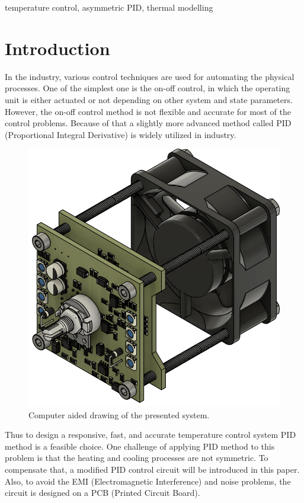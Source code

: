 \documentclass[conference]{IEEEtran}
\begin{document}
\begin{IEEEkeywords}
temperature control, asymmetric PID, thermal modelling
\end{IEEEkeywords}

\section{Introduction}
In the industry, various control techniques are used for automating the physical processes. One of the simplest one is the on-off control, in which the operating unit is either actuated or not depending on other system and state parameters. However, the on-off control method is not flexible and accurate for most of the control problems. Because of that a slightly more advanced method called PID (Proportional Integral Derivative) is widely utilized in industry.



\begin{figure}[ht]
\centerline{\includegraphics[scale=0.28]{figures/model2.png}}
\caption{Computer aided drawing of the presented system.}
\label{}
\end{figure}



Thus to design a responsive, fast, and accurate temperature control system PID method is a feasible choice. One challenge of applying PID method to this problem is that the heating and cooling processes are not symmetric. To compensate that, a modified PID control circuit will be introduced in this paper. Also, to avoid the EMI (Electromagnetic Interference) and noise problems, the circuit is designed on a PCB (Printed Circuit Board).
\end{document}
